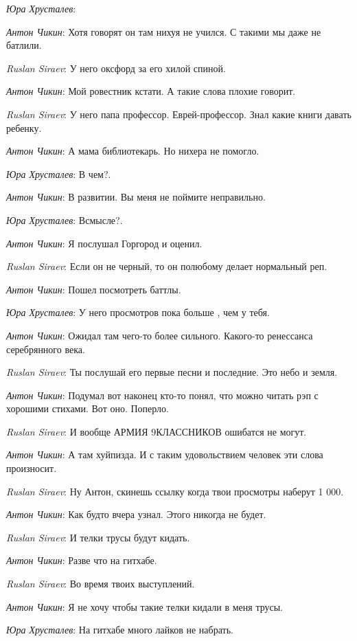 \documentclass[10pt]{book}
\newcommand{\AUTHOR}[1]{\emph{#1}:}
\begin{document}
\AUTHOR{Юра Хрусталев}

\AUTHOR{Антон Чикин} Хотя говорят он там нихуя не учился. С такими мы даже не батлили.

\AUTHOR{Ruslan Siraev} У него оксфорд за его хилой спиной.

\AUTHOR{Антон Чикин} Мой ровестник кстати. А такие слова плохие говорит.

\AUTHOR{Ruslan Siraev} У него папа профессор. Еврей-профессор. Знал какие книги давать ребенку.

\AUTHOR{Антон Чикин} А мама библиотекарь. Но нихера не помогло.

\AUTHOR{Юра Хрусталев} В чем?.

\AUTHOR{Антон Чикин} В развитии. Вы меня не поймите неправильно.

\AUTHOR{Юра Хрусталев} Всмысле?.

\AUTHOR{Антон Чикин} Я послушал Горгород и оценил.

\AUTHOR{Ruslan Siraev} Если он не черный, то он полюбому делает нормальный реп.

\AUTHOR{Антон Чикин} Пошел посмотреть баттлы.

\AUTHOR{Юра Хрусталев} У него просмотров пока больше , чем у тебя.

\AUTHOR{Антон Чикин} Ожидал там чего-то более сильного. Какого-то ренессанса серебрянного века.

\AUTHOR{Ruslan Siraev} Ты послушай его первые песни и последние. Это небо и земля.

\AUTHOR{Антон Чикин} Подумал вот наконец кто-то понял, что можно читать рэп с хорошими стихами. Вот оно. Поперло.

\AUTHOR{Ruslan Siraev} И вообще АРМИЯ 9КЛАССНИКОВ ошибатся не могут.

\AUTHOR{Антон Чикин} А там хуйпизда. И с таким удовольствием человек эти слова произносит.

\AUTHOR{Ruslan Siraev} Ну Антон, скинешь ссылку когда твои просмотры наберут 1 000.

\AUTHOR{Антон Чикин} Как будто вчера узнал. Этого никогда не будет.

\AUTHOR{Ruslan Siraev} И телки трусы будут кидать.

\AUTHOR{Антон Чикин} Разве что на гитхабе.

\AUTHOR{Ruslan Siraev} Во время твоих выступлений.

\AUTHOR{Антон Чикин} Я не хочу чтобы такие телки кидали в меня трусы.

\AUTHOR{Юра Хрусталев} На гитхабе много лайков не набрать.
\end{document}
